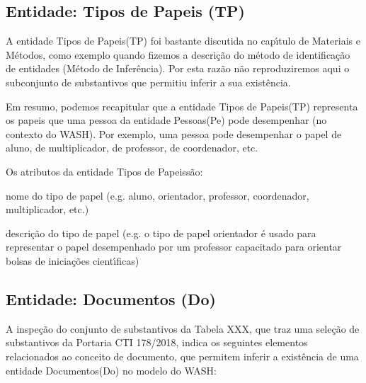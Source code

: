 \documentclass[
12pt,		%
openright,	%
twoside,  %
a4paper,			%
chapter=TITLE,		%
english,			%
french,				%
spanish,			%
brazil				%
]{USPSC-classe/USPSC}
\begin{document}
\subsection[Entidade: Tipos de Papeis (TP)]{Entidade: Tipos de Papeis (TP)}\label{Entidade: Tipos de Papeis (TP)}
A entidade \textquotedbl Tipos de Papeis\textquotedbl  (TP) foi bastante discutida no cap\'{\i}tulo de Materiais e M\'etodos, como exemplo quando fizemos a descri\c{c}\~ao do m\'etodo de identifica\c{c}\~ao de entidades (\textquotedbl M\'etodo de Infer\^encia\textquotedbl ). Por esta raz\~ao n\~ao reproduziremos aqui o subconjunto de substantivos que permitiu inferir a sua exist\^encia.









Em resumo, podemos recapitular que a entidade \textquotedbl Tipos de Papeis\textquotedbl  (TP) representa os papeis que uma pessoa da entidade \textquotedbl Pessoas\textquotedbl  (Pe) pode desempenhar (no contexto do WASH). Por exemplo, uma pessoa pode desempenhar o papel de aluno, de multiplicador, de professor, de coordenador, etc.









Os atributos da entidade \textquotedbl Tipos de Papeis\textquotedbl  s\~ao:










\begin{alineas}
\item nome do tipo de papel (e.g. aluno, orientador, professor, coordenador, multiplicador, etc.)
\item descri\c{c}\~ao do tipo de papel (e.g. \textquotedbl o tipo de papel orientador \'e usado para representar o papel desempenhado por um professor capacitado para orientar bolsas de inicia\c{c}\~oes cient\'{\i}ficas\textquotedbl )
\end{alineas}

\subsection[Entidade: Documentos (Do)]{Entidade: Documentos (Do)}\label{Entidade: Documentos (Do)}
A inspe\c{c}\~ao do conjunto de substantivos da Tabela XXX, que traz uma sele\c{c}\~ao de substantivos da Portaria CTI 178/2018, indica os seguintes elementos relacionados ao conceito de \textquotedbl documento\textquotedbl , que permitem inferir a exist\^encia de uma entidade \textquotedbl Documentos\textquotedbl  (Do) no modelo do WASH:
\end{document}
